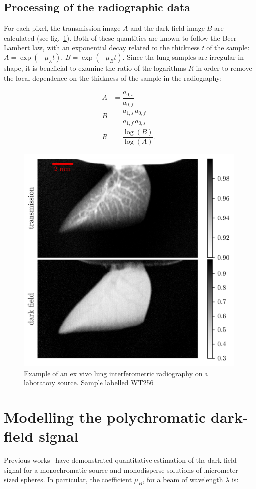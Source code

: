 \subsection{Processing of the radiographic data}\label{sec:radioprocessing}
For each pixel, the transmission image $A$ and the
dark-field image $B$ are calculated (see fig.~\ref{590406}). Both of these
quantities are known to follow the Beer-Lambert law, with an exponential
decay related to the thickness $t$ of the sample: $A = \exp(-\mu_A t)$, $B =
\exp(-\mu_B t)$. Since the lung samples are irregular in shape, it is
beneficial to examine the ratio of the logarithms $R$ in
order to remove the local dependence on the thickness of the sample in the
radiography:

\begin{align*}
    A &= \dfrac{a_{0,s}}{a_{0,f}}\\
    B &= \dfrac{a_{1,s}}{a_{1,f}}\dfrac{a_{0,f}}{a_{0,s}}\\
    R &= \dfrac{\log(B)}{\log(A)}.
    \label{eqn:definitions}
\end{align*}
\begin{figure}[h!]
\begin{center}
\includegraphics[width=0.70\columnwidth]{gfx/lung-paper-figures/KO373_LL_smoke/WT256_LL_smoke}
\caption{{Example of an ex vivo lung interferometric radiography on a laboratory
source. Sample labelled WT256.
{\label{590406}}%
}}
\end{center}
\end{figure}

\section{Modelling the polychromatic dark-field signal}\label{sec:model}
Previous works~\cite{Lynch:11,Gkoumas2016} have demonstrated quantitative estimation of
the dark-field signal for a monochromatic source and monodisperse solutions
of micrometer-sized spheres. In particular, the coefficient $\mu_B$, for a
beam of wavelength $\lambda$ is:

